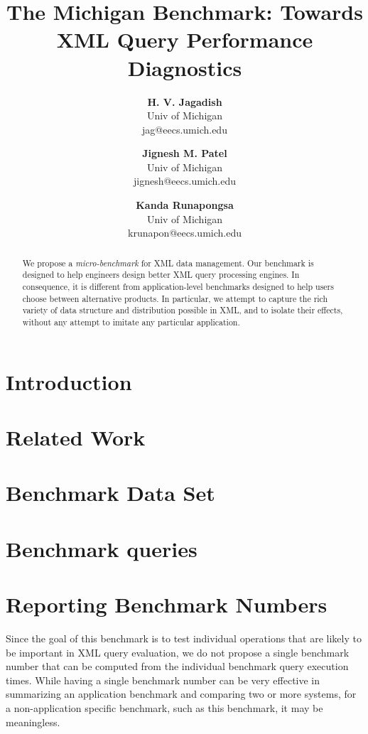 \documentclass[fleqn,11pt]{article}
\title{\bf The Michigan Benchmark: Towards XML Query Performance Diagnostics}
\author{
{\bf H. V. Jagadish} \\
Univ of Michigan\\
jag@eecs.umich.edu
\and
{\bf Jignesh M. Patel}\\
Univ of Michigan\\
jignesh@eecs.umich.edu
\and
{\bf Kanda Runapongsa}\\
Univ of Michigan\\
krunapon@eecs.umich.edu
}
\begin{document}
\maketitle



\begin{abstract}
{\footnotesize
We propose a {\em micro-benchmark} for XML data management.  Our benchmark is
designed to help engineers design better XML query processing engines.  In
consequence, it is different from application-level benchmarks designed to
help users choose between alternative products.  In particular, we attempt to
capture the rich variety of data structure and distribution possible
in XML, and to isolate their effects, without any attempt to imitate any particular application.}
\end{abstract}

\vspace*{0.25in}


\section{Introduction}
\label{sec:intro}


\section{Related Work}
\label{sec:rel}


\section{Benchmark Data Set}


\section{Benchmark queries}
\label{sec:queries}


\section{Reporting Benchmark Numbers}
Since the goal of this benchmark is to test individual operations that are
likely to be important in XML query evaluation, we do not propose a single
benchmark number that can be computed from the individual benchmark query
execution times. While having a single benchmark number can be very effective
in summarizing an application benchmark and comparing two or more systems,
for a non-application specific benchmark, such as this benchmark, it may be
meaningless.
\end{document}
